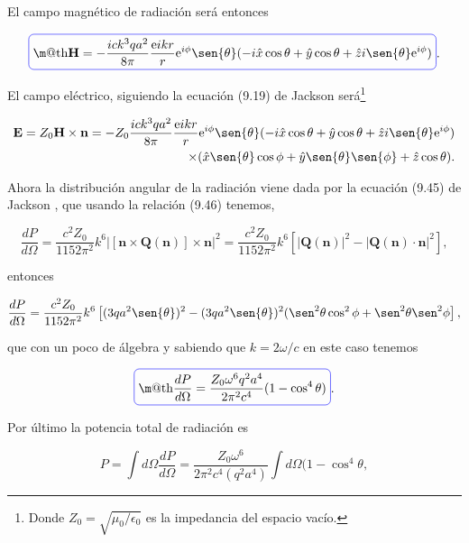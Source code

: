 \documentclass[a4paper,11pt]{article}
\makeatletter
\numberwithin{equation}{section}
\newcommand*{\boxcolor}{blue}
\renewcommand{\boxed}[1]{\textcolor{\boxcolor}{%
\tikz[baseline={([yshift=-1ex]current bounding box.center)}] \node [rectangle, minimum width=1ex,rounded corners,draw] {\normalcolor\m@th$\displaystyle#1$};}}
\newcommand{\euler}{\mathrm{e}}
\makeatother
\begin{document}
El campo magnético de radiación será entonces 

\begin{equation}
 \boxed{\mathbf{H} = - \frac{ick^3qa^2}{8\pi}\frac{\euler{ikr}}{r} \euler^{i\phi} 
 \sen{\theta}(-i \hat{x} \cos{\theta} + \hat{y} \cos{\theta} + \hat{z} i \sen{\theta} 
 \euler^{i\phi})}.
\end{equation}

El campo eléctrico, siguiendo la ecuación (9.19) de Jackson \cite{jackson} será\footnote{
Donde $Z_0 = \sqrt{\mu_0/\epsilon_0}$ es la impedancia del espacio vacío.}

\begin{align*}
 \mathbf{E} = Z_0 \mathbf{H} \times \mathbf{n} = - Z_0 \frac{ick^3qa^2}{8\pi}\frac{\euler{ikr}}{r} \euler^{i\phi} 
 \sen{\theta}(-i \hat{x} \cos{\theta} + \hat{y} \cos{\theta} + \hat{z} i \sen{\theta} 
 \euler^{i\phi}) \\ \times (\hat{x} \sen{\theta}\cos{\phi} + \hat{y} \sen{\theta}\sen{\phi} 
 + \hat{z} \cos{\theta}).
\end{align*}

Ahora la distribución angular de la radiación viene dada por la ecuación (9.45) de 
Jackson \cite{jackson}, que usando la relación (9.46) tenemos,

\begin{equation}
 \frac{dP}{d\Omega} = \frac{c^2 Z_0}{1152 \pi^2}k^6 |[\mathbf{n} \times 
 \mathbf{Q}(\mathbf{n})] \times \mathbf{n}|^2 = \frac{c^2 Z_0}{1152 \pi^2}k^6
 \left[|\mathbf{Q}(\mathbf{n})|^2 - |\mathbf{Q}(\mathbf{n})\cdot \mathbf{n}|^2 \right],
\end{equation}

entonces 

\begin{equation}
 \frac{dP}{d\Omega} = \frac{c^2 Z_0}{1152 \pi^2}k^6 \left[(3qa^2\sen{\theta})^2 
 - (3qa^2\sen{\theta})^2(\sen^2{\theta}\cos^2{\phi} + \sen^2{\theta}\sen^2{\phi}\right],
\end{equation}

que con un poco de álgebra y sabiendo que $k=2\omega/c$ en este caso tenemos 

\begin{equation}
 \boxed{\frac{dP}{d\Omega} = \frac{Z_0\omega^6 q^2 a^4}{2\pi^2 c^4}(1 - \cos^4{\theta})}.
\end{equation}

Por último la potencia total de radiación es 

\begin{equation}
 P = \int d\Omega \frac{dP}{d\Omega} = \frac{Z_0\omega^6}{2\pi^2c^4(q^2a^4)} 
 \int d\Omega (1 - \cos^4{\theta},
\end{equation}
\end{document}

